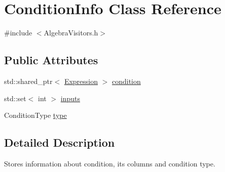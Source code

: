\hypertarget{class_condition_info}{\section{Condition\+Info Class Reference}
\label{class_condition_info}
}


{\ttfamily \#include $<$Algebra\+Visitors.\+h$>$}

\subsection*{Public Attributes}
\begin{DoxyCompactItemize}
\item 
std\+::shared\+\_\+ptr$<$ \hyperlink{class_expression}{Expression} $>$ \hyperlink{class_condition_info_a57923bd70f56a79ca3ae8d09bb14f550}{condition}
\item 
std\+::set$<$ int $>$ \hyperlink{class_condition_info_ab800ad40c4040827cd93acc048863213}{inputs}
\item 
Condition\+Type \hyperlink{class_condition_info_a8ceacc67eb6d52679a9541764fd8b7d6}{type}
\end{DoxyCompactItemize}


\subsection{Detailed Description}
Stores information about condition, its columns and condition type. 

